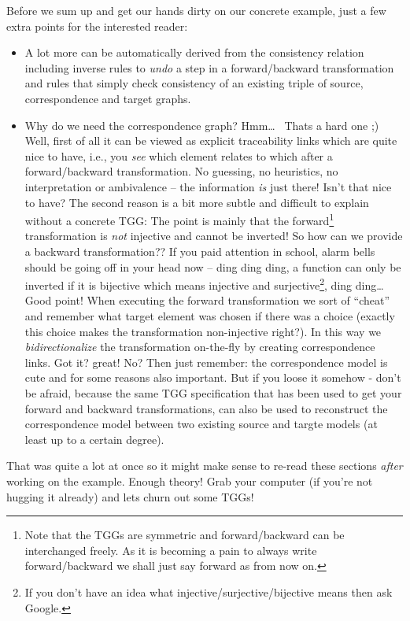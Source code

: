 Before we sum up and get our hands dirty on our concrete example, just a few extra points for the interested reader:  
\begin{itemize}
\item A lot more can be automatically derived from the consistency relation including inverse rules to \emph{undo} a step in a forward/backward transformation and rules that simply check consistency of an existing triple of source, correspondence and target graphs.

\item Why do we need the correspondence graph?  Hmm\dots~  Thats a hard one ;)  Well, first of all it can be viewed as explicit traceability links which are quite nice to have, i.e., you \emph{see} which element relates to which after a forward/backward transformation. No guessing, no heuristics, no interpretation or ambivalence -- the information \emph{is} just there!
Isn't that nice to have?
The second reason is a bit more subtle and difficult to explain without a concrete TGG:  The point is mainly that the forward\footnote{Note that the TGGs are symmetric and forward/backward can be interchanged freely.  As it is becoming a pain to always write forward/backward we shall just say forward as from now on.} transformation is \emph{not} injective and cannot be inverted!
So how can we provide a backward transformation??
If you paid attention in school, alarm bells should be going off in your head now -- ding ding ding, a function can only be inverted if it is bijective which means injective and surjective\footnote{If you don't have an idea what injective/surjective/bijective means then ask Google.}, ding ding\ldots~
Good point!  When executing the forward transformation we sort of ``cheat'' and remember what target element was chosen if there was a choice (exactly this choice makes the transformation non-injective right?).
In this way we \emph{bidirectionalize} the transformation on-the-fly by creating correspondence links.
Got it? great! No?  Then just remember: the correspondence model is cute and for some reasons also important.
But if you loose it somehow - don't be afraid, because the same TGG specification that has been used to get your forward and backward transformations, can also be used to reconstruct the correspondence model between two existing source and targte models (at least up to a certain degree).
\end{itemize}

That was quite a lot at once so it might make sense to re-read these sections \emph{after} working on the example.
Enough theory!  Grab your computer (if you're not hugging it already) and lets churn out some TGGs!
